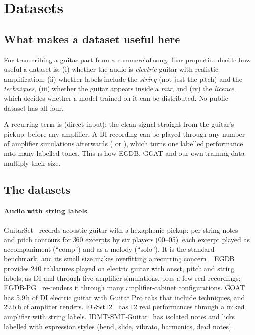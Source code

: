 \section{Datasets}
\label{sec:datasets}

\subsection{What makes a dataset useful here}

For transcribing a guitar part from a commercial song, four properties decide
how useful a dataset is: (i) whether the audio is \emph{electric} guitar with
realistic amplification, (ii) whether labels include the \emph{string} (not just
the pitch) and the \emph{techniques}, (iii) whether the guitar appears inside a
\emph{mix}, and (iv) the \emph{licence}, which decides whether a model trained
on it can be distributed. No public dataset has all four.

A recurring term is  (direct input): the clean signal straight from the
guitar's pickup, before any amplifier. A DI recording can be played through any
number of amplifier simulations afterwards ( or
), which turns one labelled performance into many labelled
tones. This is how EGDB, GOAT and our own training data multiply their size.

\subsection{The datasets}

\paragraph{Audio with string labels.}
GuitarSet~\cite{xi2018guitarset} records acoustic guitar with a hexaphonic
pickup: per-string notes and pitch contours for 360 excerpts by six players
(00--05), each excerpt played as accompaniment (``comp'') and as a melody
(``solo''). It is the standard benchmark, and its small size makes overfitting a
recurring concern~\cite{zang2024synthtab}.
EGDB~\cite{chen2022egdb} provides 240 tablatures played on electric guitar with
onset, pitch and string labels, as DI and through five amplifier simulations,
plus a few real recordings; EGDB-PG~\cite{chen2025egdbpg} re-renders it through
many amplifier-cabinet configurations.
GOAT~\cite{loth2025goat} has 5.9\,h of DI electric guitar with Guitar Pro tabs
that include techniques, and 29.5\,h of amplifier renders.
EGSet12~\cite{pedroza2024tones} has 12 real performances through a miked
amplifier with string labels.
IDMT-SMT-Guitar~\cite{kehling2014idmt} has isolated notes and licks labelled
with expression styles (bend, slide, vibrato, harmonics, dead notes).

